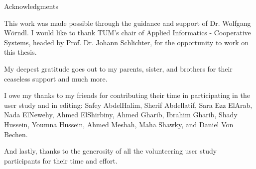 \thispagestyle{empty}

\vspace*{2cm}

\begin{center}
{ Acknowledgments}
\end{center}

\vspace{1cm}
This work was made possible through the guidance and support of Dr. Wolfgang
W\"{o}rndl. I would like to thank TUM's chair of Applied Informatics - Cooperative
Systems, headed by Prof. Dr. Johann Schlichter, for the opportunity to work on
this thesis.\par
My deepest gratitude goes out to my parents, sister, and brothers for their
ceaseless support and much more.\par
I owe my thanks to my friends for contributing their time in participating
in the user study and in editing: Safey AbdelHalim, Sherif Abdellatif, Sara
Ezz ElArab, Nada ElNewehy, Ahmed ElShirbiny, Ahmed Gharib, Ibrahim Gharib, Shady
Hussein, Youmna Hussein, Ahmed Mesbah, Maha Shawky, and Daniel Von Bechen.\par
And lastly, thanks to the generosity of all the volunteering
user study participants for their time and effort.

\cleardoublepage{}
